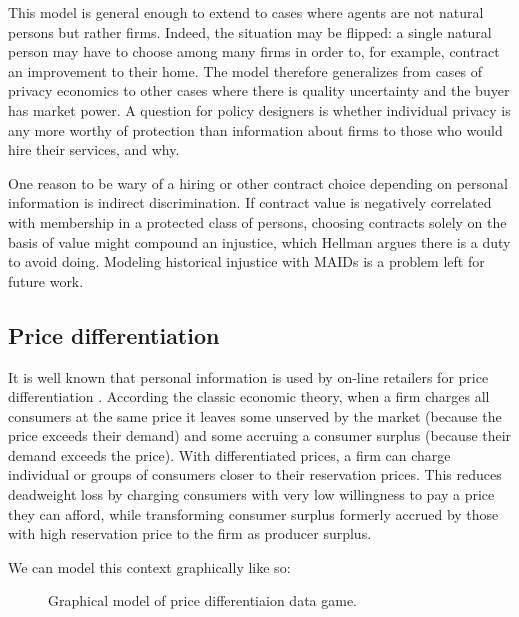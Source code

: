 \documentclass[../thesis.tex]{subfiles}
\begin{document}
This model is general enough to extend to cases where
agents are not natural persons but rather firms.
Indeed, the situation may be flipped: a single
natural person may have to choose among many firms
in order to, for example, contract an improvement to
their home.
The model therefore generalizes from cases of privacy
economics to other cases where there is quality uncertainty
and the buyer has market power.
A question for policy designers is whether individual
privacy is any more worthy of protection than
information about firms to those who would
hire their services, and why.

One reason to be wary of a hiring or other contract
choice depending on personal information is indirect
discrimination.
If contract value is negatively correlated with membership
in a protected class of persons, choosing contracts solely
on the basis of value might compound an injustice, which
Hellman argues there is a duty to avoid doing.
\cite{hellman2017indirect}
Modeling historical injustice with MAIDs is a problem
left for future work.

\subsection{Price differentiation}
\label{sec:price-differentiation}

It is well known that personal information
is used by on-line retailers for price differentiation 
\cite{shapiro1998information, varian2001economics}.
According the classic economic theory,
when a firm charges all consumers at the same price
it leaves
some unserved by the market (because the price
exceeds their demand) and some accruing a
consumer surplus (because their demand exceeds
the price).
With differentiated prices, a firm can charge
individual or groups of consumers
closer to their reservation prices. 
This reduces deadweight loss by
charging consumers with very low willingness to pay
a price they can afford, while transforming consumer
surplus formerly accrued by those with high reservation
price to the firm as producer surplus.

We can model this context graphically like so:

\begin{figure}
\begin{center}
\end{center}
\caption{Graphical model of price differentiaion data game.}
\end{figure}
\end{document}
